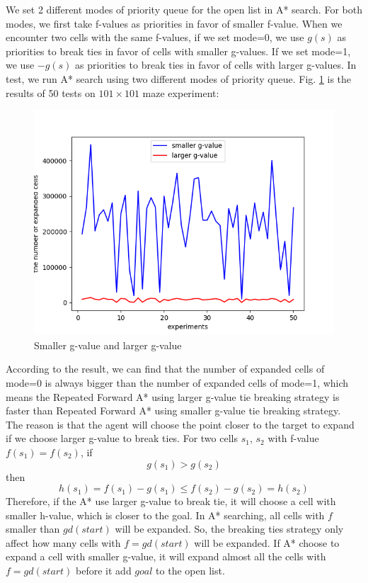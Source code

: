 \documentclass[11pt]{article}
\begin{document}
We set 2 different modes of priority queue for the open list in A* search. For both modes, we first take f-values as priorities in favor of smaller f-value. When we encounter two cells with the same f-values, if we set mode=0,  we use $g(s)$ as priorities to break ties in favor of cells with smaller g-values. If we set mode=1, we use $-g(s)$ as priorities to break ties in favor of cells with larger g-values. In test, we run A* search using two different modes of priority queue. Fig. \ref{fig:Fig2.S&L} is the results of 50 tests on $101\times 101$ maze experiment:
\begin{figure}[htb]
	\centering
	\includegraphics[scale = 0.3]{smaller_g_and_larger_g.png}
	\caption{Smaller g-value and larger g-value}
	\label{fig:Fig2.S&L}
\end{figure}
\newline
According to the result, we can find that the number of expanded cells of mode=0 is always bigger than the number of expanded cells of mode=1, which means the Repeated Forward A* using larger g-value tie breaking strategy is faster than Repeated Forward A* using smaller g-value tie breaking strategy.\\
The reason is that the agent will choose the point closer to the target to expand if we choose larger g-value to break ties. For two cells $s_1$, $s_2$ with f-value $f(s_1)=f(s_2)$, if $$g(s_1)>g(s_2)$$
then
	$$h(s_1) = f(s_1) - g(s_1)
	\leq f(s_2) - g(s_2)
	=h(s_2)$$ 
Therefore, if the A* use larger g-value to break tie, it will choose a cell with smaller h-value, which is closer to the goal. In A* searching, all cells with $f$ smaller than $gd(start)$ will be expanded. So, the breaking ties strategy only affect how many cells with $f = gd(start)$ will be expanded. If A* choose to expand a cell with smaller g-value, it will expand almost all the cells with $f = gd(start)$ before it add $goal$ to the open list.
\end{document}
